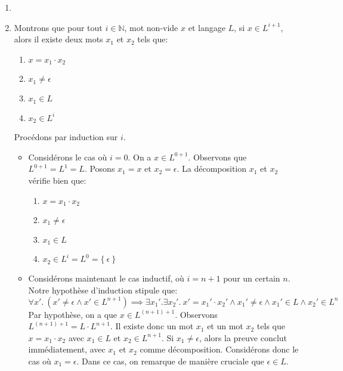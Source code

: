 \documentclass[12pt,french,a4paper]{article}
\begin{document}
\begin{question}
\begin{enumerate}
\item

\item

Montrons que pour tout $i \in \mathbb{N}$, mot non-vide $x$ et langage $L$, si $x \in L^{i+1}$, alors il existe deux mots $x_1$ et $x_2$ tels que:
\begin{enumerate}
\item $x = x_1 \cdot x_2$
\item $x_1 \neq \epsilon$
\item $x_1 \in L$
\item $x_2 \in L^i$
\end{enumerate}
Procédons par induction sur $i$.
\begin{itemize}
\item Considérons le cas où $i = 0$. On a $x \in L^{0+1}$. Observons que $L^{0+1} = L^1 = L$. Posons $x_1 = x$ et $x_2 = \epsilon$. La décomposition $x_1$ et $x_2$ vérifie bien que: 
\begin{enumerate}
\item $x = x_1 \cdot x_2$
\item $x_1 \neq \epsilon$
\item $x_1 \in L$
\item $x_2 \in L^i = L^0 = \{\ \epsilon\ \}$
\end{enumerate}

\item Considérons maintenant le cas inductif, où $i = n + 1$ pour un certain $n$. Notre hypothèse d'induction stipule que:
\[
\forall x'.\ (x' \neq \epsilon \wedge x' \in L^{n+1}) \implies \exists x_1'. \exists x_2'.\ x' = x_1' \cdot x_2' \wedge x_1' \neq \epsilon \wedge x_1' \in L \wedge x_2' \in L^n
\]
Par hypothèse, on a que $x \in L^{(n + 1) + 1}$. Observons $L^{(n + 1) + 1} = L \cdot L^{n + 1}$.
Il existe donc un mot $x_1$ et un mot $x_2$ tels que $x = x_1 \cdot x_2$ avec $x_1 \in L$ et $x_2 \in L^{n + 1}$.
Si $x_1 \neq \epsilon$, alors la preuve conclut immédiatement, avec $x_1$ et $x_2$ comme décomposition.
Considérons donc le cas où $x_1 = \epsilon$. Dans ce cas, on remarque de manière cruciale que $\epsilon \in L$.


\end{itemize}
\end{enumerate}
\end{question}
\end{document}
